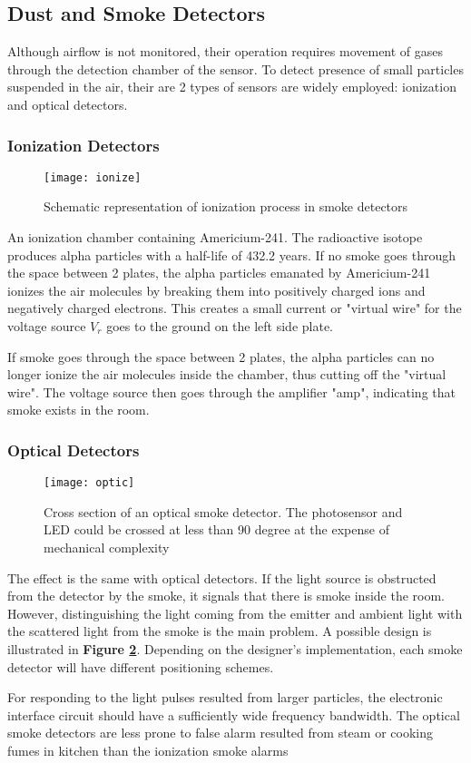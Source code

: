 \subsection{Dust and Smoke Detectors}
Although airflow is not monitored, their operation requires movement of gases through the detection chamber of the sensor. To detect presence of small particles suspended in the air, their are 2 types of sensors are widely employed: ionization and optical detectors.
\subsubsection{Ionization Detectors}
\begin{figure}[ht]
	\centering
	\texttt{[image: ionize]}
	\caption{Schematic representation of ionization process in smoke detectors}
	\label{ion}
\end{figure}
An ionization chamber containing Americium-241. The radioactive isotope produces alpha particles with a half-life of 432.2 years. If no smoke goes through the space between 2 plates, the alpha particles emanated by Americium-241 ionizes the air molecules by breaking them into positively charged ions and negatively charged electrons. This creates a small current or "virtual wire" for the voltage source $ V_r $ goes to the ground on the left side plate.

If smoke goes through the space between 2 plates, the alpha particles can no longer ionize the air molecules inside the chamber, thus cutting off the "virtual wire". The voltage source then goes through the amplifier "amp", indicating that smoke exists in the room.

\subsubsection{Optical Detectors}
\begin{figure}[ht]
	\centering
	\texttt{[image: optic]}
	\caption{Cross section of an optical smoke detector. The photosensor and LED could be crossed at less than 90 degree at the expense of mechanical complexity \cite{handbook}}
	\label{optic}
\end{figure}
The effect is the same with optical detectors. If the light source is obstructed from the detector by the smoke, it signals that there is smoke inside the room. However, distinguishing the light coming from the emitter and ambient light with the scattered light from the smoke is the main problem. A possible design is illustrated in \textbf{Figure \ref{optic}}. Depending on the designer's implementation, each smoke detector will have different positioning schemes.

For responding to the light pulses resulted from larger particles, the electronic interface circuit should have a sufficiently wide frequency bandwidth. The optical smoke detectors are less prone to false alarm resulted from steam or cooking fumes in kitchen than the ionization smoke alarms